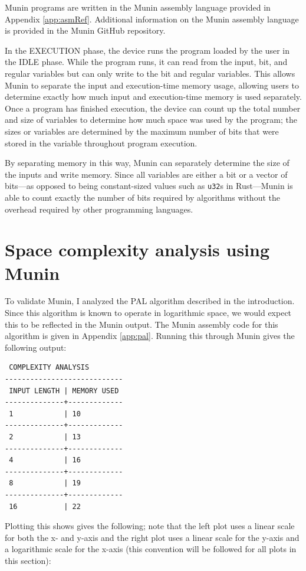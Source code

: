 \documentclass[11pt, a4paper]{article}
\begin{document}
Munin programs are written in the Munin assembly language provided in Appendix \ref{app:asmRef}.
Additional information on the Munin assembly language is provided in the Munin GitHub repository.

In the EXECUTION phase, the device runs the program loaded by the user in the IDLE phase.
While the program runs, it can read from the input, bit, and regular variables but can only write to the bit and regular variables.
This allows Munin to separate the input and execution-time memory usage, allowing users to determine exactly how much input and execution-time memory is used separately.
Once a program has finished execution, the device can count up the total number and size of variables to determine how much space was used by the program; the sizes or variables are determined by the maximum number of bits that were stored in the variable throughout program execution.

By separating memory in this way, Munin can separately determine the size of the inputs and write memory.
Since all variables are either a bit or a vector of bits—as opposed to being constant-sized values such as \lstinline|u32|s in Rust—Munin is able to count exactly the number of bits required by algorithms without the overhead required by other programming languages.

\section{Space complexity analysis using Munin}

To validate Munin, I analyzed the PAL algorithm described in the introduction.
Since this algorithm is known to operate in logarithmic space, we would expect this to be reflected in the Munin output.
The Munin assembly code for this algorithm is given in Appendix \ref{app:pal}.
Running this through Munin gives the following output:

\begin{lstlisting}
 COMPLEXITY ANALYSIS
----------------------------
 INPUT LENGTH | MEMORY USED 
--------------+-------------
 1            | 10      
--------------+-------------
 2            | 13      
--------------+-------------
 4            | 16      
--------------+-------------
 8            | 19      
--------------+-------------
 16           | 22      
\end{lstlisting}

Plotting this shows gives the following; note that the left plot uses a linear scale for both the x- and y-axis and the right plot uses a linear scale for the y-axis and a logarithmic scale for the x-axis (this convention will be followed for all plots in this section):
\end{document}
